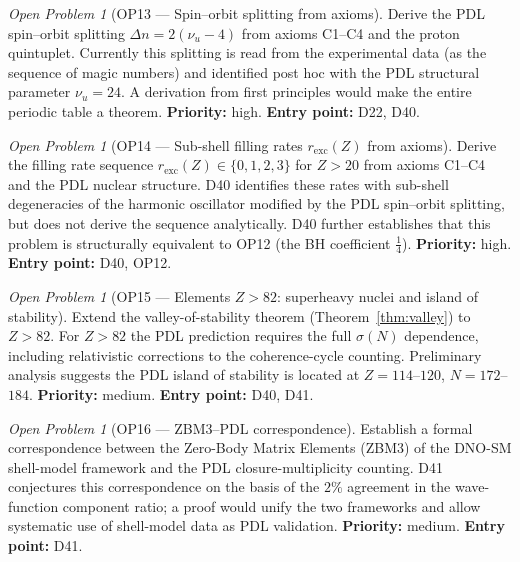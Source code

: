 \documentclass[11pt,a4paper]{article}
\theoremstyle{plain}
\theoremstyle{definition}
\theoremstyle{remark}
\newtheorem{openproblem}[theorem]{Open Problem}
\newcommand{\sigmaN}{\sigma(N)}
\begin{document}
\begin{openproblem}[OP13 --- Spin--orbit splitting from axioms]
\label{op:spinorbit}
Derive the PDL spin--orbit splitting $\Delta n=2(\nu_u-4)$ from axioms C1--C4 and the proton quintuplet. Currently this splitting is read from the experimental data (as the sequence of magic numbers) and identified post hoc with the PDL structural parameter $\nu_u=24$. A derivation from first principles would make the entire periodic table a theorem. \textbf{Priority:} high. \textbf{Entry point:} D22, D40.
\end{openproblem}

\begin{openproblem}[OP14 --- Sub-shell filling rates $r_{\mathrm{exc}}(Z)$ from axioms]
\label{op:filling}
Derive the filling rate sequence $r_{\mathrm{exc}}(Z)\in\{0,1,2,3\}$ for $Z>20$ from axioms C1--C4 and the PDL nuclear structure. D40 identifies these rates with sub-shell degeneracies of the harmonic oscillator modified by the PDL spin--orbit splitting, but does not derive the sequence analytically. D40 further establishes that this problem is structurally equivalent to OP12 (the BH coefficient $\tfrac{1}{4}$). \textbf{Priority:} high. \textbf{Entry point:} D40, OP12.
\end{openproblem}

\begin{openproblem}[OP15 --- Elements $Z>82$: superheavy nuclei and island of stability]
\label{op:superheavy}
Extend the valley-of-stability theorem (Theorem~\ref{thm:valley}) to $Z>82$. For $Z>82$ the PDL prediction requires the full $\sigmaN$ dependence, including relativistic corrections to the coherence-cycle counting. Preliminary analysis suggests the PDL island of stability is located at $Z=114$--$120$, $N=172$--$184$. \textbf{Priority:} medium. \textbf{Entry point:} D40, D41.
\end{openproblem}

\begin{openproblem}[OP16 --- ZBM3--PDL correspondence]
\label{op:ZBM3}
Establish a formal correspondence between the Zero-Body Matrix Elements (ZBM3) of the DNO-SM shell-model framework and the PDL closure-multiplicity counting. D41 conjectures this correspondence on the basis of the $2\%$ agreement in the wave-function component ratio; a proof would unify the two frameworks and allow systematic use of shell-model data as PDL validation. \textbf{Priority:} medium. \textbf{Entry point:} D41.
\end{openproblem}
\end{document}
